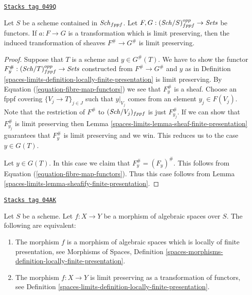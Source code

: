 \begin{lemma}
\label{spaces-limits-lemma-sheafify-finite-presentation-map}
\href{https://stacks.math.columbia.edu/tag/049Q}{\texttt{Stacks tag 049Q}}

Let $S$ be a scheme contained in $\mathit{Sch}_{fppf}$.
Let $F, G : (\mathit{Sch}/S)_{fppf}^{opp} \to \textit{Sets}$ be functors.
If $a : F \to G$ is a transformation which is limit preserving,
then the induced transformation of sheaves
$F^\# \to G^\#$ is limit preserving.
\end{lemma}

\begin{proof}
Suppose that $T$ is a scheme and $y \in G^\#(T)$.
We have to show the functor
$F^\#_y : (\mathit{Sch}/T)_{fppf}^{opp} \to \textit{Sets}$
constructed from $F^\# \to G^\#$ and $y$ as in
Definition \ref{spaces-limits-definition-locally-finite-presentation}
is limit preserving.
By Equation (\ref{equation-fibre-map-functors})
we see that $F^\#_y$ is a sheaf. Choose an fppf covering
$\{V_j \to T\}_{j \in J}$ such that $y|_{V_j}$ comes from
an element $y_j \in F(V_j)$.
Note that the restriction of $F^\#$ to $(\mathit{Sch}/V_j)_{fppf}$
is just $F^\#_{y_j}$. If we can show that $F^\#_{y_j}$ is
limit preserving then
Lemma \ref{spaces-limits-lemma-sheaf-finite-presentation}
guarantees that $F^\#_y$ is limit preserving and
we win. This reduces us to the case $y \in G(T)$.

\medskip\noindent
Let $y \in G(T)$. In this case we claim that $F^\#_y = (F_y)^\#$.
This follows from
Equation (\ref{equation-fibre-map-functors}).
Thus this case follows from
Lemma \ref{spaces-limits-lemma-sheafify-finite-presentation}.
\end{proof}

\begin{proposition}
\label{spaces-limits-proposition-characterize-locally-finite-presentation}
\href{https://stacks.math.columbia.edu/tag/04AK}{\texttt{Stacks tag 04AK}}

Let $S$ be a scheme. Let $f : X \to Y$ be a morphism of algebraic
spaces over $S$. The following are equivalent:
\begin{enumerate}
\item The morphism $f$ is a morphism of algebraic spaces which is
locally of finite presentation, see
Morphisms of Spaces,
Definition \ref{spaces-morphisms-definition-locally-finite-presentation}.
\item The morphism $f : X \to Y$ is limit preserving as
a transformation of functors, see
Definition \ref{spaces-limits-definition-locally-finite-presentation}.
\end{enumerate}
\end{proposition}

